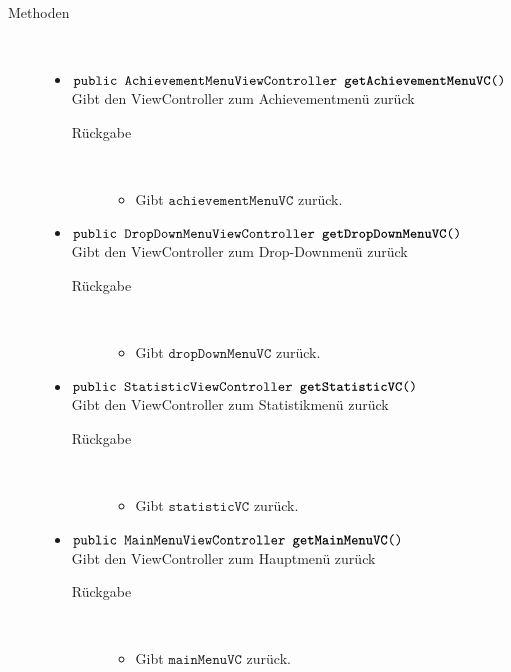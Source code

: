 \begin{description}
\begin{itemize}
		\end{itemize}
	
	
\item[Methoden] \hfill \\
	\vspace{-.8cm}
	\begin{itemize}
		\item $\texttt{public AchievementMenuViewController \textbf{getAchievementMenuVC}()}$ \\ Gibt den ViewController zum Achievementmenü zurück
		\begin{description}
			\item[Rückgabe] \hfill \\
			\vspace{-.8cm}
			\begin{itemize}
				\item Gibt $\texttt{achievementMenuVC}$ zurück.
			\end{itemize}
			\end{description}
		
		\item $\texttt{public DropDownMenuViewController \textbf{getDropDownMenuVC}()}$ \\ Gibt den ViewController zum Drop-Downmenü zurück
		\begin{description}
			\item[Rückgabe] \hfill \\
			\vspace{-.8cm}
			\begin{itemize}
				\item Gibt $\texttt{dropDownMenuVC}$ zurück.
			\end{itemize}
			\end{description}
			
		\item $\texttt{public StatisticViewController \textbf{getStatisticVC}()}$ \\ Gibt den ViewController zum Statistikmenü zurück
			\begin{description}
			\item[Rückgabe] \hfill \\
			\vspace{-.8cm}
			\begin{itemize}
				\item Gibt $\texttt{statisticVC}$ zurück.
			\end{itemize}
			\end{description}
			
		\item $\texttt{public MainMenuViewController \textbf{getMainMenuVC}()}$ \\ Gibt den ViewController zum Hauptmenü zurück
		\begin{description}
			\item[Rückgabe] \hfill \\
			\vspace{-.8cm}
			\begin{itemize}
				\item Gibt $\texttt{mainMenuVC}$ zurück.
			\end{itemize}
			\end{description}
			

\end{itemize}
\end{description}
